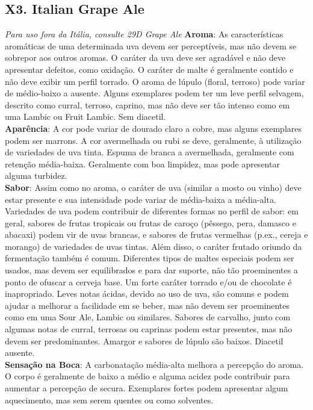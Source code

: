 \subsection*{X3. Italian Grape Ale}

\textit{Para uso fora da Itália, consulte 29D Grape Ale}
\textbf{Aroma}: As características aromáticas de uma determinada uva devem ser perceptíveis, mas não devem se sobrepor aos outros aromas. O caráter da uva deve ser agradável e não deve apresentar defeitos, como oxidação. O caráter de malte é geralmente contido e não deve exibir um perfil torrado. O aroma de lúpulo (floral, terroso) pode variar de médio-baixo a ausente. Alguns exemplares podem ter um leve perfil selvagem, descrito como curral, terroso, caprino, mas não deve ser tão intenso como em uma Lambic ou Fruit Lambic. Sem diacetil. \\
\textbf{Aparência}: A cor pode variar de dourado claro a cobre, mas alguns exemplares podem ser marrons. A cor avermelhada ou rubi se deve, geralmente, à utilização de variedades de uva tinta. Espuma de branca a avermelhada, geralmente com retenção média-baixa. Geralmente com boa limpidez, mas pode apresentar alguma turbidez. \\
\textbf{Sabor}: Assim como no aroma, o caráter de uva (similar a mosto ou vinho) deve estar presente e sua intensidade pode variar de média-baixa a média-alta. Variedades de uva podem contribuir de diferentes formas no perfil de sabor: em geral, sabores de frutas tropicais ou frutas de caroço (pêssego, pera, damasco e abacaxi) podem vir de uvas brancas, e sabores de frutas vermelhas (p.ex., cereja e morango) de variedades de uvas tintas. Além disso, o caráter frutado oriundo da fermentação também é comum. Diferentes tipos de maltes especiais podem ser usados, mas devem ser equilibrados e para dar suporte, não tão proeminentes a ponto de ofuscar a cerveja base. Um forte caráter torrado e/ou de chocolate é inapropriado. Leves notas ácidas, devido ao uso de uva, são comuns e podem ajudar a melhorar a facilidade em se beber, mas não devem ser proeminentes como em uma Sour Ale, Lambic ou similares. Sabores de carvalho, junto com algumas notas de curral, terrosas ou caprinas podem estar presentes, mas não devem ser predominantes. Amargor e sabores de lúpulo são baixos. Diacetil ausente. \\
\textbf{Sensação na Boca}: A carbonatação média-alta melhora a percepção do aroma. O corpo é geralmente de baixo a médio e alguma acidez pode contribuir para aumentar a percepção de secura. Exemplares fortes podem apresentar algum aquecimento, mas sem serem quentes ou como solventes. \\
